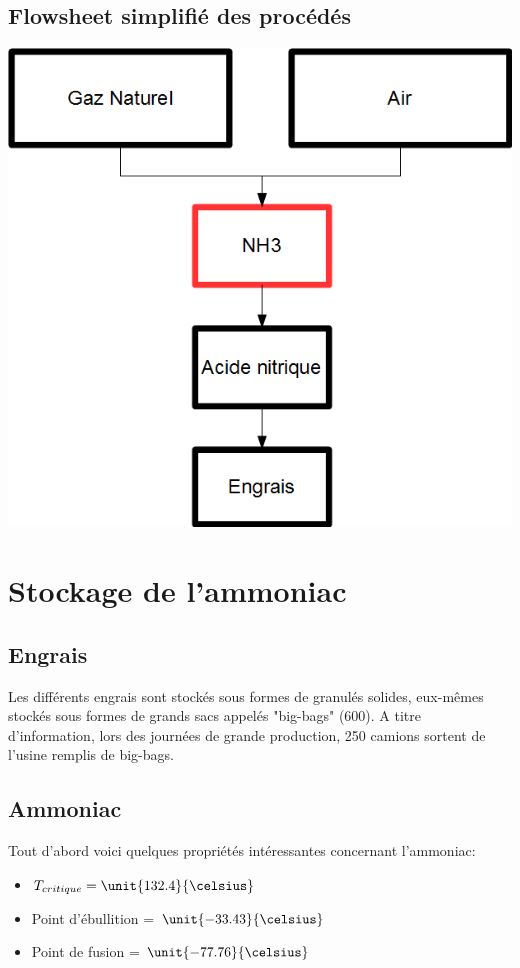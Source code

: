 \subsection*{Flowsheet simplifié des procédés}
\begin{center}
\includegraphics[scale=0.6]{FlYara.png}
\end{center}

\newpage
\section*{Stockage de l'ammoniac}
\subsection*{Engrais}
Les différents engrais sont stockés sous formes de granulés solides, eux-mêmes stockés sous formes de grands sacs appelés "big-bags" (\unit{600}{\kilogram}). A titre d'information, lors des journées de grande production, 250 camions sortent de l'usine remplis de big-bags. 
\subsection*{Ammoniac}
Tout d'abord voici quelques propriétés intéressantes concernant l'ammoniac:

\begin{itemize}
\item{$T_{critique} = \unit{132.4}{\celsius}$}

\item{Point d'ébullition = $\unit{-33.43}{\celsius}$}

\item{Point de fusion = $\unit{-77.76}{\celsius}$}
\end{itemize}

